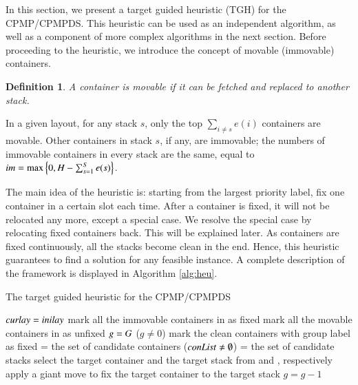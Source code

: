 \documentclass[review,3p,times,authoryear,12pt]{elsarticle}
\newtheorem{definition}{Definition}
\begin{document}
In this section, we present a target guided heuristic (TGH) for the CPMP/CPMPDS. This heuristic can be used as an independent algorithm, as well as a component of more complex algorithms in the next section. Before proceeding to the heuristic, we introduce the concept of movable (immovable) containers.

\begin{definition}
\label{def:1}
A container is movable if it can be fetched and replaced to another stack.
\end{definition}

In a given layout, for any stack $s$, only the top $\sum\limits_{i\neq s}e(i)$ containers are movable. Other containers in stack $s$, if any, are immovable; the numbers of immovable containers in every stack are the same, equal to $\id{im}=\max\left\{0, H-\sum_{s=1}^S e(s)\right\}$.

The main idea of the heuristic is: starting from the largest priority label, fix one container in a certain slot each time. After a container is fixed, it will not be relocated any more, except a special case. We resolve the special case by relocating fixed containers back. This will be explained later.
As containers are fixed continuously, all the stacks become clean in the end. Hence, this heuristic guarantees to find a solution for any feasible instance. A complete description of the framework is displayed in Algorithm \ref{alg:heu}.

\begin{algorithm}[htbp]
	\caption{The target guided heuristic for the CPMP/CPMPDS}
	\label{alg:heu}
	\begin{codebox}
	\li $\id{curlay} = \id{inilay}$
    \li mark all the immovable containers in  as fixed
    \li mark all the movable containers in  as unfixed
    \li $\id{g} = G$
    \li \While ($g\neq0$)
    \li \Do
            mark the clean containers with group label  as fixed\label{heu:c}
    \li     {} = the set of candidate containers
    \li     \While($\id{conList} \neq \emptyset$)\label{heu:l}
    \li     \Do
                 = the set of candidate stacks
    \li         select the target container and the target stack from  and , respectively
    \li         apply a giant move to fix the target container to the target stack
            \End
    \li $g=g-1$
        \End
	\end{codebox}	
\end{algorithm}
\end{document}
